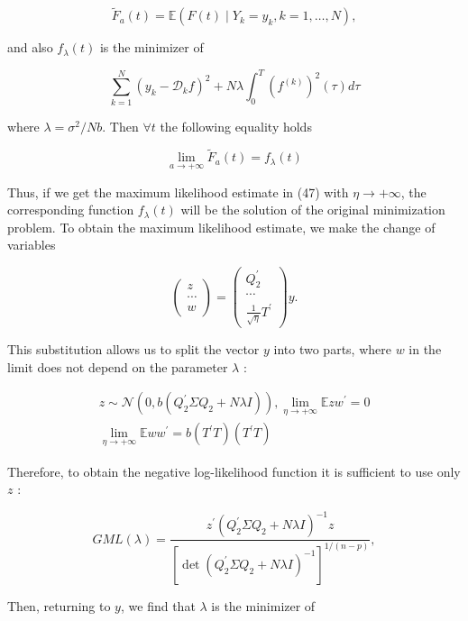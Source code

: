 \documentclass[10pt]{article}
\begin{document}
$$
\tilde{F}_{a}(t)=\mathbb{E}\left(F(t) \mid Y_{k}=y_{k}, k=1, \ldots, N\right),
$$

and also $f_{\lambda}(t)$ is the minimizer of

$$
\sum_{k=1}^{N}\left(y_{k}-\mathcal{D}_{k} f\right)^{2}+N \lambda \int_{0}^{T}\left(f^{(k)}\right)^{2}(\tau) d \tau
$$

where $\lambda=\sigma^{2} / N b$. Then $\forall t$ the following equality holds

$$
\lim _{a \rightarrow+\infty} \tilde{F}_{a}(t)=f_{\lambda}(t)
$$

Thus, if we get the maximum likelihood estimate in (47) with $\eta \rightarrow+\infty$, the corresponding function $f_{\lambda}(t)$ will be the solution of the original minimization problem. To obtain the maximum likelihood estimate, we make the change of variables

\[
\left(\begin{array}{c}
z  \tag{48}\\
\cdots \\
w
\end{array}\right)=\left(\begin{array}{c}
Q_{2}^{\prime} \\
\cdots \\
\frac{1}{\sqrt{\eta}} T^{\prime}
\end{array}\right) y .
\]

This substitution allows us to split the vector $y$ into two parts, where $w$ in the limit does not depend on the parameter $\lambda$ :

$$
\begin{gathered}
z \sim \mathcal{N}\left(0, b\left(Q_{2}^{\prime} \Sigma Q_{2}+N \lambda I\right)\right), \lim _{\eta \rightarrow+\infty} \mathbb{E} z w^{\prime}=0 \\
\lim _{\eta \rightarrow+\infty} \mathbb{E} w w^{\prime}=b\left(T^{\prime} T\right)\left(T^{\prime} T\right)
\end{gathered}
$$

Therefore, to obtain the negative log-likelihood function it is sufficient to use only $z$ :


\begin{equation*}
G M L(\lambda)=\frac{z^{\prime}\left(Q_{2}^{\prime} \Sigma Q_{2}+N \lambda I\right)^{-1} z}{\left[\operatorname{det}\left(Q_{2}^{\prime} \Sigma Q_{2}+N \lambda I\right)^{-1}\right]^{1 /(n-p)}}, \tag{49}
\end{equation*}


Then, returning to $y$, we find that $\lambda$ is the minimizer of
\end{document}
